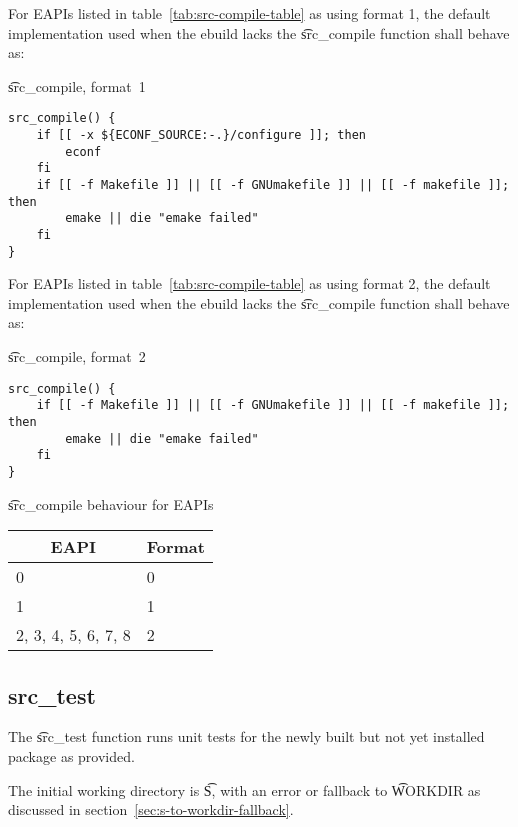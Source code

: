  For EAPIs listed in table~\ref{tab:src-compile-table} as using format
1, the default implementation used when the ebuild lacks the \t{src_compile} function shall behave
as:

\begin{listing}[H]
\caption{\t{src_compile}, format~1}
\begin{verbatim}
src_compile() {
    if [[ -x ${ECONF_SOURCE:-.}/configure ]]; then
        econf
    fi
    if [[ -f Makefile ]] || [[ -f GNUmakefile ]] || [[ -f makefile ]]; then
        emake || die "emake failed"
    fi
}
\end{verbatim}
\end{listing}

 For EAPIs listed in table~\ref{tab:src-compile-table} as using format
2, the default implementation used when the ebuild lacks the \t{src_compile} function shall behave
as:

\begin{listing}[H]
\caption{\t{src_compile}, format~2}
\begin{verbatim}
src_compile() {
    if [[ -f Makefile ]] || [[ -f GNUmakefile ]] || [[ -f makefile ]]; then
        emake || die "emake failed"
    fi
}
\end{verbatim}
\end{listing}

\begin{centertable}{\t{src_compile} behaviour for EAPIs}
    \label{tab:src-compile-table}
    \begin{tabular}{ll}
      \toprule
      \multicolumn{1}{c}{\textbf{EAPI}} &
      \multicolumn{1}{c}{\textbf{Format}} \\
      \midrule
      0                   & 0 \\
      1                   & 1 \\
      2, 3, 4, 5, 6, 7, 8 & 2 \\
      \bottomrule
    \end{tabular}
\end{centertable}

\subsection{src_test}

The \t{src_test} function runs unit tests for the newly built but not yet installed package as
provided.

The initial working directory is \t{S}, with an error or fallback to \t{WORKDIR} as discussed in
section~\ref{sec:s-to-workdir-fallback}.

